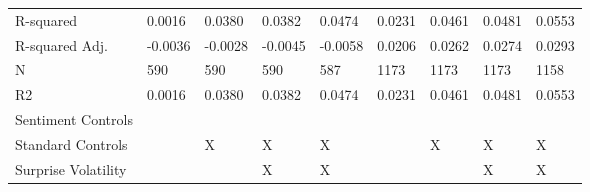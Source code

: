 \begin{tabular}{lllllllll}
R-squared & 0.0016 & 0.0380 & 0.0382 & 0.0474 & 0.0231 & 0.0461 & 0.0481 & 0.0553 \\
R-squared Adj. & -0.0036 & -0.0028 & -0.0045 & -0.0058 & 0.0206 & 0.0262 & 0.0274 & 0.0293 \\
N & 590 & 590 & 590 & 587 & 1173 & 1173 & 1173 & 1158 \\
R2 & 0.0016 & 0.0380 & 0.0382 & 0.0474 & 0.0231 & 0.0461 & 0.0481 & 0.0553 \\
Sentiment Controls &  &  &  &  &  &  &  &  \\
Standard Controls &  & X & X & X &  & X & X & X \\
Surprise Volatility &  &  & X & X &  &  & X & X \\
\bottomrule
\end{tabular}
